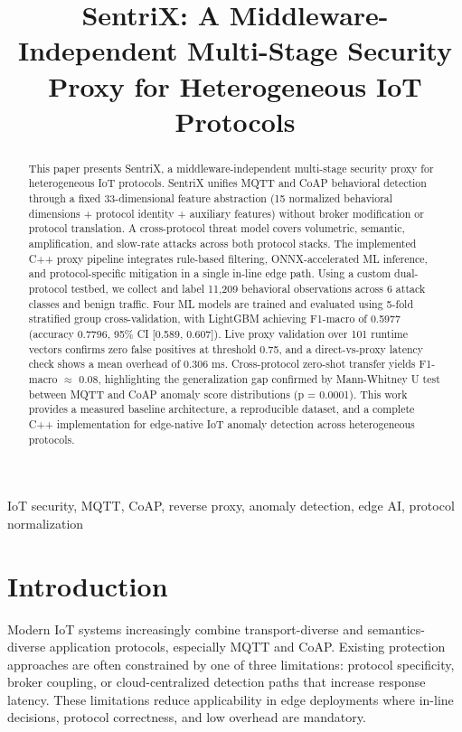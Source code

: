 \documentclass[conference]{IEEEtran}
\begin{document}
\title{SentriX: A Middleware-Independent Multi-Stage Security Proxy for Heterogeneous IoT Protocols}
\author{
\and
{}
}

\maketitle

\begin{abstract}
This paper presents SentriX, a middleware-independent multi-stage security proxy for heterogeneous IoT protocols. SentriX unifies MQTT and CoAP behavioral detection through a fixed 33-dimensional feature abstraction (15 normalized behavioral dimensions + protocol identity + auxiliary features) without broker modification or protocol translation. A cross-protocol threat model covers volumetric, semantic, amplification, and slow-rate attacks across both protocol stacks. The implemented C++ proxy pipeline integrates rule-based filtering, ONNX-accelerated ML inference, and protocol-specific mitigation in a single in-line edge path. Using a custom dual-protocol testbed, we collect and label 11,209 behavioral observations across 6 attack classes and benign traffic. Four ML models are trained and evaluated using 5-fold stratified group cross-validation, with LightGBM achieving F1-macro of 0.5977 (accuracy 0.7796, 95\% CI [0.589, 0.607]). Live proxy validation over 101 runtime vectors confirms zero false positives at threshold 0.75, and a direct-vs-proxy latency check shows a mean overhead of 0.306 ms. Cross-protocol zero-shot transfer yields F1-macro $\approx$ 0.08, highlighting the generalization gap confirmed by Mann-Whitney U test between MQTT and CoAP anomaly score distributions (p = 0.0001). This work provides a measured baseline architecture, a reproducible dataset, and a complete C++ implementation for edge-native IoT anomaly detection across heterogeneous protocols.
\end{abstract}

\begin{IEEEkeywords}
IoT security, MQTT, CoAP, reverse proxy, anomaly detection, edge AI, protocol normalization
\end{IEEEkeywords}

\section{Introduction}
Modern IoT systems increasingly combine transport-diverse and semantics-diverse application protocols, especially MQTT and CoAP. Existing protection approaches are often constrained by one of three limitations: protocol specificity, broker coupling, or cloud-centralized detection paths that increase response latency. These limitations reduce applicability in edge deployments where in-line decisions, protocol correctness, and low overhead are mandatory.
\end{document}
